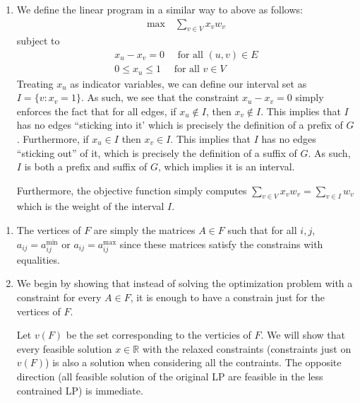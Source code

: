 \documentclass[12pt]{exam}
\newcommand{\Q}[1]{\question{\large{\textbf{#1}}}}
\begin{document}
\begin{questions}
\begin{solution}
\begin{enumerate}[label=(\alph*)]
  \item
    We define the linear program in a similar way to above as follows:
    \begin{align}
        \text{max} \quad \sum_{v \in V} x_v w_v 
      \end{align}
      subject to
      \begin{align}
        x_u - x_v = 0 \quad \text{ for all } (u,v) \in E \label{p11:constraint_1} \\
        0 \leq x_u \leq 1 \quad \text{ for all } v \in V
      \end{align}
      Treating $x_u$ as indicator variables, we can define our interval set as $I = \{ v : x_v = 1\}$. As such, we see that the constraint $x_u - x_v = 0$ simply enforces the fact that for all edges, if $x_u \notin I$, then $x_v \notin I$. This implies that $I$ has no edges ``sticking into it' which is precisely the definition of a prefix of $G$. Furthermore, if $x_u \in I$ then $x_v \in I$. This implies that $I$ has no edges ``sticking out'' of it, which is precisely the definition of a suffix of $G$. As such, $I$ is both a prefix and suffix of $G$, which implies it is an interval.

      Furthermore, the objective function simply computes $\sum_{v \in V} x_vw_v = \sum_{v \in I} w_v$ which is the weight of the interval $I$.
    \end{enumerate}
\end{solution}


\newpage
\Q{Problem 12}
\begin{solution}
  \begin{enumerate}[label=(\alph*)]
    \item
      The vertices of $F$ are simply the matrices $A \in F$ such that for all $i,j$, $a_{ij} = a_{ij}^{\min}$ or $a_{ij} = a_{ij}^{\max}$ since these matrices satisfy the constrains with equalities.
    \item
      We begin by showing that instead of solving the optimization problem with a constraint for every $A \in F$, it is enough to have a constrain just for the vertices of $F$.

      Let $v(F)$ be the set corresponding to the verticies of $F$. We will show that every feasible solution $x \in \mathbb{R}$ with the relaxed constraints (constraints just on $v(F)$) is also a solution when considering all the contraints. The opposite direction (all feasible solution of the original LP are feasible in the less contrained LP) is immediate.


\end{enumerate}
\end{solution}
\end{questions}
\end{document}
